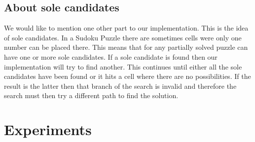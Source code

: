 \documentclass[letterpaper]{article}
\begin{document}
\subsection{About sole candidates}

We would like to mention one other part to our implementation. This is the idea of sole candidates. In a Sudoku Puzzle there are sometimes cells were only one number can be placed there. This means that for any partially solved puzzle can have one or more sole candidates. If a sole candidate is found then our implementation will try to find another. This continues until either all the sole candidates have been found or it hits a cell where there are no possibilities. If the result is the latter then that branch of the search is invalid and therefore the search must then try a different path to find the solution.

\section{Experiments}

 
\end{document}
